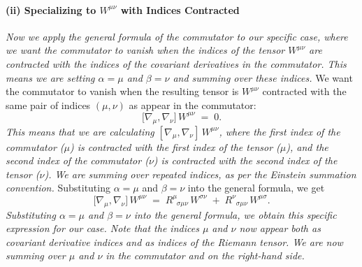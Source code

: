 \documentclass{article}
\begin{document}
\paragraph{(ii) Specializing to $W^{\mu\nu}$ with Indices Contracted}
\textit{Now we apply the general formula of the commutator to our specific case, where we want the commutator to vanish when the indices of the tensor \(W^{\mu\nu}\) are contracted with the indices of the covariant derivatives in the commutator. This means we are setting \(\alpha = \mu\) and \(\beta = \nu\) and summing over these indices.}
We want the commutator to vanish when the resulting tensor is $W^{\mu\nu}$ contracted with the same pair of indices $(\mu,\nu)$ as appear in the commutator:
\[
\bigl[\nabla_{\mu}, \nabla_{\nu}\bigr]\,W^{\mu\nu} \;=\; 0.
\]
\textit{This means that we are calculating \([\nabla_{\mu}, \nabla_{\nu}]\,W^{\mu\nu}\), where the first index of the commutator (\(\mu\)) is contracted with the first index of the tensor (\(\mu\)), and the second index of the commutator (\(\nu\)) is contracted with the second index of the tensor (\(\nu\)). We are summing over repeated indices, as per the Einstein summation convention.}
Substituting $\alpha=\mu$ and $\beta=\nu$ into the general formula, we get
\[
\bigl[\nabla_{\mu}, \nabla_{\nu}\bigr]\,W^{\mu\nu}
\;=\;
R^\mu_{\;\;\sigma\mu\nu}\,W^{\sigma\nu}
\;+\;
R^\nu_{\;\;\sigma\mu\nu}\,W^{\mu\sigma}.
\]
\textit{Substituting \(\alpha = \mu\) and \(\beta = \nu\) into the general formula, we obtain this specific expression for our case. Note that the indices \(\mu\) and \(\nu\) now appear both as covariant derivative indices and as indices of the Riemann tensor. We are now summing over \(\mu\) and \(\nu\) in the commutator and on the right-hand side.}
\end{document}
